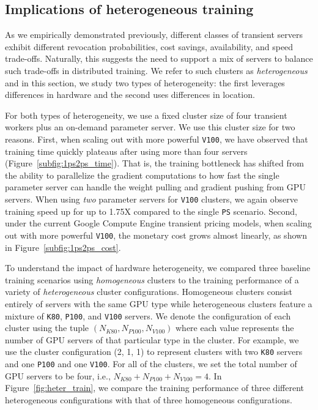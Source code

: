 \subsection{Implications of heterogeneous training}
\label{subsec:heter_train}


As we empirically demonstrated previously, different classes of transient
servers exhibit different revocation probabilities, cost savings, availability,
and speed trade-offs. Naturally, this suggests the need to support a mix of
servers to balance such trade-offs in distributed training. We refer to such
clusters as \emph{heterogeneous} and in this section, we study two types of
heterogeneity: the first leverages  differences in  hardware and the
second uses differences in location.

For both types of heterogeneity, we use a fixed cluster size of four transient
workers plus an on-demand parameter server. We use this cluster size for
two reasons. First, when scaling out with more powerful \texttt{V100}, we
have observed that training time quickly plateaus after using more than four
servers (Figure~\ref{subfig:1ps2ps_time}). That is, the training bottleneck has
shifted from the ability to parallelize the gradient computations to how fast
the single parameter server can handle the weight pulling and gradient pushing
from GPU servers.  When using \emph{two} parameter servers for \texttt{V100}
clusters, we again observe training speed up for up to 1.75X compared to the
single \texttt{PS} scenario.  Second, under the current Google Compute Engine
transient pricing models, when scaling out with more powerful \texttt{V100},
the monetary cost grows almost linearly, as shown in
Figure~\ref{subfig:1ps2ps_cost}.

%

To understand the impact of hardware heterogeneity, we compared three baseline
training scenarios using \emph{homogeneous} clusters to the training
performance of a variety of \emph{heterogeneous} cluster configurations.
Homogeneous clusters consist entirely of servers with the same GPU type while
heterogeneous clusters feature a mixture of \texttt{K80}, \texttt{P100}, and
\texttt{V100} servers. We denote the configuration of each  cluster using the
tuple $(N_{K80}, N_{P100}, N_{V100})$ where each value represents the number of
GPU servers of that particular type in the cluster.   For example, we use the
cluster configuration (2, 1, 1) to represent clusters with two \texttt{K80}
servers and one \texttt{P100} and one \texttt{V100}.  For all of the
clusters, we set the total number of GPU servers to be four, i.e., $N_{K80} +
N_{P100} + N_{V100} = 4$. 
%
In Figure~\ref{fig:heter_train}, we compare the training performance of three
different heterogeneous configurations with that of three homogeneous
configurations. 

